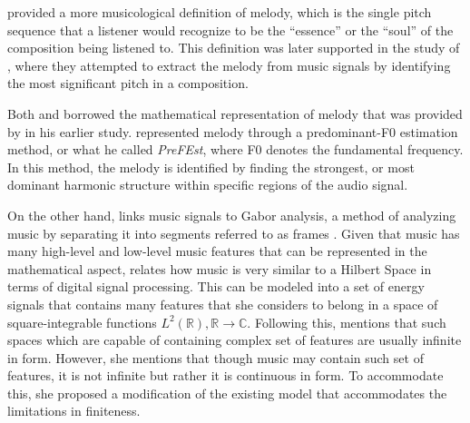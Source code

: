 
\citet{poliner2007melody} provided a more musicological definition of melody, which is the single pitch sequence that a listener would recognize to be the ``essence'' or the ``soul'' of the composition being listened to. This definition was later supported in the study of \citet{salamon2012melody}, where they attempted to extract the melody from music signals by identifying the most significant pitch in a composition. 

Both \citet{poliner2007melody} and \citet{salamon2012melody} borrowed the mathematical representation of melody that was provided by \citet{goto2004real} in his earlier study. \citeauthor{goto2004real} represented melody through a predominant-F0 estimation method, or what he called \textit{PreFEst}, where F0 denotes the fundamental frequency. In this method, the melody is identified by finding the strongest, or most dominant harmonic structure within specific regions of the audio signal. 

\begin{comment}
However, according to \citet{dannenberg1993music}, representing music mathematically is difficult as there are some elements involved that cannot be represented by math, like the emotion involved when playing music. Despite this, research has gone into analyzing the elements of music that can be represented mathematically, such as pitch, which has a key role in music as it determines how ``high'' or ``low'' a note would sound.
\end{comment}

On the other hand, \citet{dorfler2001time} links music signals to Gabor analysis, a method of analyzing music by separating it into segments referred to as frames \citep{gabor1946theory}. Given that music has many high-level and low-level music features that can be represented in the mathematical aspect, \citet{dorfler2001time} relates how music is very similar to a Hilbert Space in terms of digital signal processing. This can be modeled into a set of energy signals that contains many features that she considers to belong in a space of square-integrable functions \begin{math} {L}^2 (\mathbb{R}),\mathbb{R} \rightarrow  \mathbb{C}  \end{math}. Following this, \citet{dorfler2001time} mentions that such spaces which are capable of containing complex set of features are usually infinite in form. However, she mentions that though music may contain such set of features, it is not infinite but rather it is continuous in form. To accommodate this, she proposed a modification of the existing model that accommodates the limitations in finiteness.

